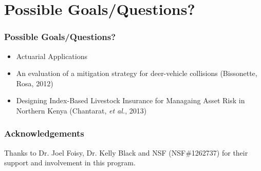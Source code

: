 \documentclass{beamer}   %
\begin{document}






\section{Possible Goals/Questions?}

\begin{frame}
    \frametitle{Possible Goals/Questions?}
	\begin{itemize}
		\item Actuarial Applications
		\item An evaluation of a mitigation strategy for deer-vehicle collisions (Bissonette, Rosa, 2012)
		\item Designing Index-Based Livestock Insurance for Managaing Asset Risk in Northern Kenya (Chantarat, \emph{et al.}, 2013) 
	\end{itemize}
\end{frame}


\begin{frame}
    \frametitle{Acknowledgements}
	Thanks to Dr. Joel Foisy, Dr. Kelly Black and NSF (NSF\#1262737) for their support and involvement in this program.
\end{frame}
\end{document}
